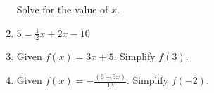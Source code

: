 \documentclass[12pt, oneside]{article}
\begin{document}
\begin{enumerate}
\vspace{3cm}
Solve for the value of $x$.

\item   $5=\frac{1}{2}x+2x-10$ \vspace{3cm}


\item Given $f(x)=3x+5$. Simplify $f(3)$. \vspace{4cm}
\item Given $\displaystyle f(x)=-\frac{(6+3x)}{13}$. Simplify $f(-2)$.

\newpage

\end{enumerate}
\end{document}
